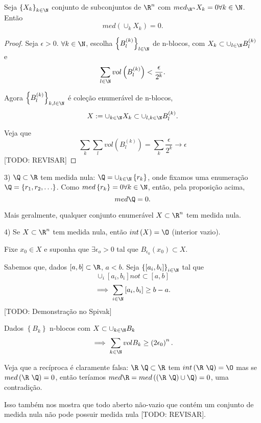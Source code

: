 \begin{prop}
    Seja $\left\{ X_k \right\}_{k\in \N}$ conjunto de subconjuntos de $\R^{n}$ com $med_{\R^{n}}X_k = 0 \forall k\in \N$. Então \[
    med\left( \cup _{k}X_k \right) = 0
    .\] 
\end{prop}

\begin{proof}
    Seja $\epsilon>0$. $\forall k\in \N$, escolha $\left\{ B_l^{(k)} \right\}_{l\in \N}$ de n-blocos, com $X_k \subset  \cup _{l\in \N}B_l^{(k)}$ e \[
    \sum_{l\in \N} vol\left( B_l^{(k)} \right) < \frac{\epsilon}{2^{k}}
    .\] 

    Agora $\left\{ B_l^{(k)} \right\}_{k,l \in \N}$ é coleção enumerável de n-blocos, \[
    X:= \cup _{k\in \N}X_k \subset \cup _{l,k\in \N}B_l^{(k)}
    .\]

    Veja que \[
    \sum_{k} \sum_{l} vol\left( B_l^{(k)} \right) = \sum_{k} \frac{\epsilon}{2^{k}} \to  \epsilon
\] [TODO: REVISAR] 
\end{proof}

\begin{eg}
    3) $\Q\subset \R$ tem medida nula: $\Q = \cup_{k\in \N}\left\{ r_k \right\} $, onde fixamos uma enumeração $\Q=\left\{ r_1,r_2,\ldots \right\}$. Como $med \left\{ r_k \right\} = 0 \forall k\in \N$, então, pela proposição acima, \[
    med \Q = 0.
    \] 

    Mais geralmente, qualquer conjunto enumerável $X \subset \R^{n}$ tem medida nula.
\end{eg}

\begin{eg}
    4) Se $X \subset  \R^{n}$ tem medida nula, então $int\left( X \right) = \O$ (interior vazio).

    Fixe $x_0 \in X$ e suponha que $\exists \epsilon_o>0$ tal que $B_{\epsilon_0}\left( x_0 \right) \subset X$.

    Sabemos que, dados $\left[ a,b \right] \subset \R$, $a<b$. Seja $\left\{ \left[ a_i,b_i \right]  \right\} _{i\in \N}$ tal que \[
    \cup _i \left[ a_i, b_i \right] not \subset \left[ a,b \right] 
    \]  \[
    \implies \sum_{i\in \N} \left[ a_i, b_i \right] \ge b-a
.\] [TODO: Demonstração no Spivak] 

    Dados $\left\{ B_k \right\} $ n-blocos com $X\subset \cup _{k\in \N}B_k$ \[
    \implies \sum_{k\in \N} vol B_k \ge \left( 2 \epsilon_0 \right) ^{n} 
    .\] 
\end{eg}

\begin{note}
    Veja que a recíproca é claramente falsa:
    $\R\ \Q\subset \R$ tem $int\left( \R\ \Q \right) =\O$ mas se $med\left( \R \ \Q \right) = 0$, então teríamos $med \R = med\left( \left( \R \ \Q \right) \cup \Q \right) = 0$, uma contradição.

    Isso também nos mostra que todo aberto não-vazio que contém um conjunto de medida nula não pode possuir medida nula [TODO: REVISAR].
\end{note}

